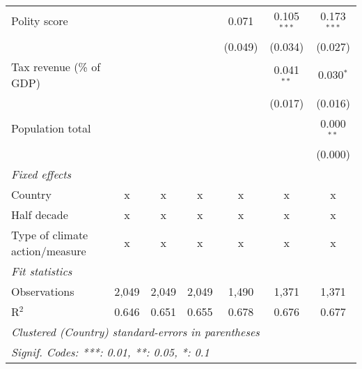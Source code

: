 \begin{tabular}{lcccccc}
   Polity score                                                    &              &                &                & 0.071          & 0.105$^{***}$  & 0.173$^{***}$\\   
                                                                   &              &                &                & (0.049)        & (0.034)        & (0.027)\\   
   Tax revenue (\% of GDP)                                         &              &                &                &                & 0.041$^{**}$   & 0.030$^{*}$\\   
                                                                   &              &                &                &                & (0.017)        & (0.016)\\   
   Population total                                                &              &                &                &                &                & 0.000$^{**}$\\   
                                                                   &              &                &                &                &                & (0.000)\\   
   \emph{Fixed effects}\\
   Country                                                         & x            & x              & x              & x              & x              & x\\  
   Half decade                                                     & x            & x              & x              & x              & x              & x\\  
   Type of climate action/measure                                  & x            & x              & x              & x              & x              & x\\  
   \midrule \emph{Fit statistics}\\
   Observations                                                    & 2,049        & 2,049          & 2,049          & 1,490          & 1,371          & 1,371\\  
   R$^2$                                                           & 0.646        & 0.651          & 0.655          & 0.678          & 0.676          & 0.677\\  
   \midrule
   \multicolumn{7}{l}{\emph{Clustered (Country) standard-errors in parentheses}}\\
   \multicolumn{7}{l}{\emph{Signif. Codes: ***: 0.01, **: 0.05, *: 0.1}}\\
\end{tabular}
\par\endgroup


